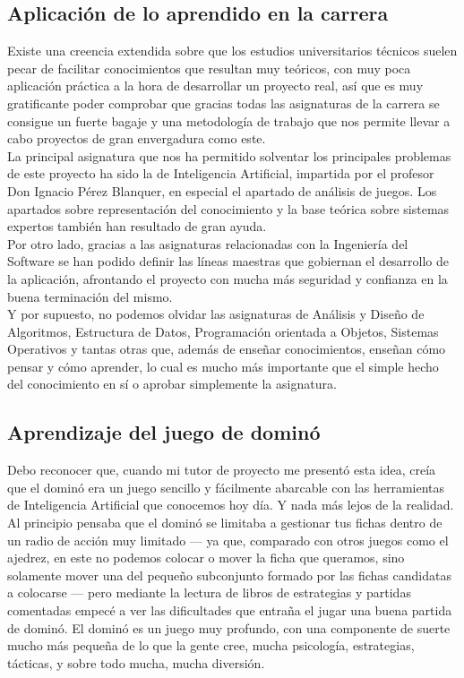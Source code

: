 \subsection{Aplicación de lo aprendido en la carrera}

Existe una creencia extendida sobre que los estudios universitarios técnicos suelen pecar de facilitar conocimientos que
resultan muy teóricos, con muy poca aplicación práctica a la hora de desarrollar un proyecto real, así que es muy
gratificante poder comprobar que gracias todas las asignaturas de la carrera se consigue un fuerte bagaje y una metodología
de trabajo que nos permite llevar a cabo proyectos de gran envergadura como este. \\

La principal asignatura que nos ha permitido solventar los principales problemas de este proyecto ha sido la de Inteligencia
Artificial, impartida por el profesor Don Ignacio Pérez Blanquer, en especial el apartado de análisis de juegos. Los apartados
sobre representación del conocimiento y la base teórica sobre sistemas expertos también han resultado de gran ayuda. \\

Por otro lado, gracias a las asignaturas relacionadas con la Ingeniería del Software se han podido definir las líneas
maestras que gobiernan el desarrollo de la aplicación, afrontando el proyecto con mucha más seguridad y confianza en la
buena terminación del mismo. \\

Y por supuesto, no podemos olvidar las asignaturas de Análisis y Diseño de Algoritmos, Estructura de Datos, Programación
orientada a Objetos, Sistemas Operativos y tantas otras que, además de enseñar conocimientos, enseñan cómo pensar y
cómo aprender, lo cual es mucho más importante que el simple hecho del conocimiento en sí o aprobar simplemente la asignatura.


\subsection{Aprendizaje del juego de dominó}

Debo reconocer que, cuando mi tutor de proyecto me presentó esta idea, creía que el dominó era un juego sencillo y
fácilmente abarcable con las herramientas de Inteligencia Artificial que conocemos hoy día. Y nada más lejos de la realidad. \\

Al principio pensaba que el dominó se limitaba a gestionar tus fichas dentro de un radio de acción muy limitado --- ya
que, comparado con otros juegos como el ajedrez, en este no podemos colocar o mover la ficha que queramos, sino 
solamente mover una del pequeño subconjunto formado por las fichas candidatas a colocarse --- pero mediante la lectura
de libros de estrategias y partidas comentadas empecé a ver las dificultades que entraña el jugar una buena partida
de dominó. El dominó es un juego muy profundo, con una componente de suerte mucho más pequeña de lo que la gente cree,
mucha psicología, estrategias, tácticas, y sobre todo mucha, mucha diversión. \\

